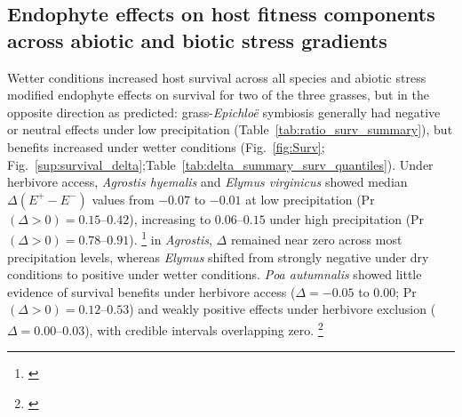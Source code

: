 \documentclass[12pt]{article}\usepackage[]{graphicx}\usepackage[dvipsnames]{xcolor}
\newcommand{\tom}[2]{{\color{red}{#1}}\footnote{\textit{\color{red}{#2}}}}
\begin{document}
\subsection*{Endophyte effects on host fitness components across abiotic and biotic stress gradients}
Wetter conditions increased host survival across all species and abiotic stress modified endophyte effects on survival for two of the three grasses, but in the opposite direction as predicted: grass-\textit{Epichloë} symbiosis generally had negative or neutral effects under low precipitation (Table~\ref{tab:ratio_surv_summary}), but benefits increased under wetter conditions (Fig.~\ref{fig:Surv}; Fig.~\ref{sup:survival_delta};Table~\ref{tab:delta_summary_surv_quantiles}).
Under herbivore access, \textit{Agrostis hyemalis} and \textit{Elymus virginicus} showed median 
$\Delta (E^+ - E^-)$ values from $-0.07$ to $-0.01$ at low precipitation (Pr$(\Delta>0) = 0.15$--$0.42$), increasing to $0.06$--$0.15$ under high precipitation (Pr$(\Delta>0) = 0.78$--$0.91$). 
\tom{Herbivore exclusion weakened these effects:}{I don't see this in the figure. It actually looks like a stronger switch from costly to beneficial in herbivore exclusion.} in \textit{Agrostis}, $\Delta$ remained near zero across most precipitation levels, whereas \textit{Elymus} shifted from strongly negative under dry conditions to positive under wetter conditions. 
\textit{Poa autumnalis} showed little evidence of survival benefits under herbivore access ($\Delta = -0.05$ to $0.00$; Pr$(\Delta>0) = 0.12$--$0.53$) and weakly positive effects under herbivore exclusion ($\Delta = 0.00$--$0.03$), with credible intervals overlapping zero.
\tom{}{Survival figure comment: if you are going to visualize plot means, can you make point sizes proportional to sample sizes of the plots? I would also jitter and add transparency to the points. Values near zero and one are getting cut off- can you extend the margins a bit? The background gridlines make the figure bery busy IMO.}
\end{document}
